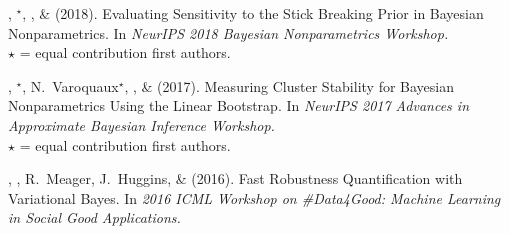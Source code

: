 \mestar, \runjing{}$^\star$, \mike, \& \tamara (2018).
Evaluating Sensitivity to the Stick Breaking Prior in Bayesian Nonparametrics.
In \emph{NeurIPS 2018 Bayesian Nonparametrics Workshop.}\\
$\star$ = equal contribution first authors.

\mestar, \runjing{}$^\star$, N.~Varoquaux$^\star$, \mike, \& \tamara (2017).
Measuring Cluster Stability for Bayesian Nonparametrics Using the Linear Bootstrap.
In \emph{NeurIPS 2017 Advances in Approximate Bayesian Inference Workshop.}\\
$\star$ = equal contribution first authors.

\me, \tamara, R.~Meager, J.~Huggins, \& \mike (2016). Fast Robustness
Quantification with Variational Bayes. In \emph{2016 ICML Workshop on
\#Data4Good: Machine Learning in Social Good Applications.}
